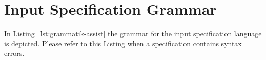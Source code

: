 
\chapter{Input Specification Grammar}
\label{cha:input-spec-grammar}

In Listing~\ref{lst:grammatik-assist} the grammar for the input specification language is depicted. Please refer to this Listing when a specification contains syntax errors.

  


